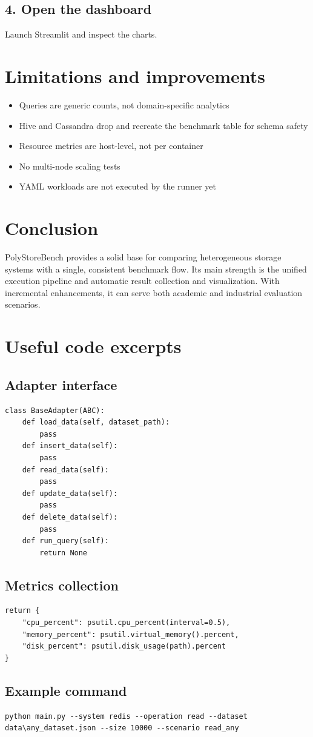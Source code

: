 \documentclass[12pt]{report}
\begin{document}
\section{4. Open the dashboard}
Launch Streamlit and inspect the charts.

\chapter{Limitations and improvements}
\begin{itemize}
  \item Queries are generic counts, not domain-specific analytics
  \item Hive and Cassandra drop and recreate the benchmark table for schema safety
  \item Resource metrics are host-level, not per container
  \item No multi-node scaling tests
  \item YAML workloads are not executed by the runner yet
\end{itemize}

\chapter{Conclusion}
PolyStoreBench provides a solid base for comparing heterogeneous storage systems with a single,
consistent benchmark flow. Its main strength is the unified execution pipeline and automatic
result collection and visualization. With incremental enhancements, it can serve both academic
and industrial evaluation scenarios.

\appendix
\chapter{Useful code excerpts}
\section{Adapter interface}
\begin{lstlisting}[caption={Base adapter interface}]
class BaseAdapter(ABC):
    def load_data(self, dataset_path):
        pass
    def insert_data(self):
        pass
    def read_data(self):
        pass
    def update_data(self):
        pass
    def delete_data(self):
        pass
    def run_query(self):
        return None
\end{lstlisting}

\section{Metrics collection}
\begin{lstlisting}[caption={CPU/RAM/Disk collection}]
return {
    "cpu_percent": psutil.cpu_percent(interval=0.5),
    "memory_percent": psutil.virtual_memory().percent,
    "disk_percent": psutil.disk_usage(path).percent
}
\end{lstlisting}

\section{Example command}
\begin{verbatim}
python main.py --system redis --operation read --dataset data\any_dataset.json --size 10000 --scenario read_any
\end{verbatim}
\end{document}
